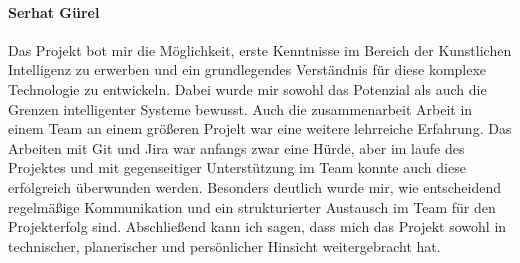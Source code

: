 \paragraph{Serhat Gürel}
Das Projekt bot mir die Möglichkeit, erste Kenntnisse im Bereich der Kunstlichen Intelligenz zu erwerben und ein grundlegendes Verständnis für diese komplexe Technologie zu entwickeln. Dabei wurde mir sowohl das Potenzial als auch die Grenzen intelligenter Systeme bewusst. Auch die zusammenarbeit Arbeit in einem Team an einem größeren Projelt war eine weitere lehrreiche Erfahrung. Das Arbeiten mit Git und Jira war anfangs zwar eine Hürde, aber im laufe des Projektes und mit gegenseitiger Unterstützung im Team konnte auch diese erfolgreich überwunden werden. Besonders deutlich wurde mir, wie entscheidend regelmäßige Kommunikation und ein strukturierter Austausch im Team für den Projekterfolg sind. Abschließend kann ich sagen, dass mich das Projekt sowohl in technischer, planerischer und persönlicher Hinsicht weitergebracht hat.